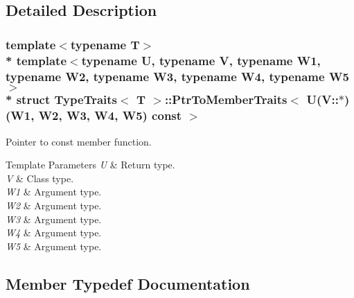 \subsection{Detailed Description}
\subsubsection*{template$<$typename T$>$\\*
template$<$typename U, typename V, typename W1, typename W2, typename W3, typename W4, typename W5$>$\\*
struct Type\+Traits$<$ T $>$\+::\+Ptr\+To\+Member\+Traits$<$ U(\+V\+::$\ast$)(\+W1, W2, W3, W4, W5) const  $>$}

Pointer to const member function. 
\begin{DoxyTemplParams}{Template Parameters}
{\em U} & Return type. \\
\hline
{\em V} & Class type. \\
\hline
{\em W1} & Argument type. \\
\hline
{\em W2} & Argument type. \\
\hline
{\em W3} & Argument type. \\
\hline
{\em W4} & Argument type. \\
\hline
{\em W5} & Argument type. \\
\hline
\end{DoxyTemplParams}


\subsection{Member Typedef Documentation}
